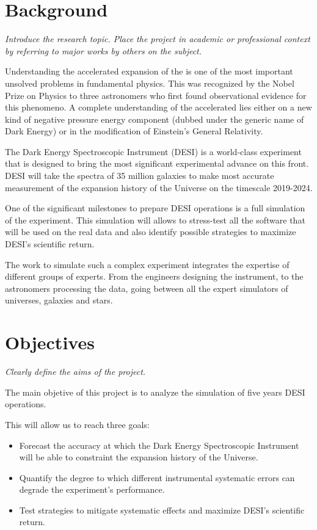 \documentclass[12pt]{article}
\begin{document}
\section*{Background}
\textit{Introduce the research topic. Place the project in academic or
professional context by referring to major works by others on the
subject. }

Understanding the accelerated expansion of the is one of the most
important unsolved problems in fundamental physics.  
This was recognized by the Nobel Prize on Physics to three astronomers
who first found observational evidence for this phenomeno.
A complete understanding of the accelerated lies either on a new kind
of negative pressure energy component (dubbed under the generic name
of Dark Energy) or in the modification of Einstein's General
Relativity. 

The Dark Energy Spectroscopic Instrument (DESI) is a world-class
experiment that is designed to bring the most significant experimental
advance on this front. 
DESI will take the spectra of 35 million galaxies to make most
accurate measurement of the expansion history of the Universe on the
timescale 2019-2024.  

One of the significant milestones to prepare DESI operations is a
full simulation of the experiment.  
This simulation will allows to stress-test all the software that will
be used on the real data and also identify possible strategies to
maximize DESI's scientific return.  

The work to simulate such a complex experiment integrates the expertise of
different groups of experts. From the engineers designing 
the instrument, to the astronomers processing the data, going between
all the expert simulators of universes, galaxies and stars. 




\section*{Objectives}
\textit{Clearly define the aims of the project.}

The main objetive of this project is to analyze the simulation of five
years DESI operations.

This will allow us to reach three goals:
\begin{itemize}
\item Forecast the accuracy at which the Dark Energy Spectroscopic
  Instrument will be able to constraint the expansion history of the Universe. 
\item Quantify the degree to which different instrumental systematic
  errors can degrade the experiment's performance.
\item Test strategies to mitigate systematic effects and maximize
  DESI's scientific return.
\end{itemize}
\end{document}
